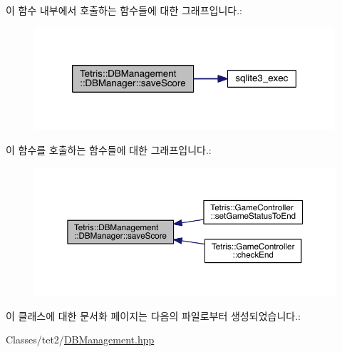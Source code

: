 이 함수 내부에서 호출하는 함수들에 대한 그래프입니다.\+:
\nopagebreak
\begin{figure}[H]
\begin{center}
\leavevmode
\includegraphics[width=316pt]{class_tetris_1_1_d_b_management_1_1_d_b_manager_aef16da1d2e564caa309bfc3b3e419d7e_cgraph}
\end{center}
\end{figure}
이 함수를 호출하는 함수들에 대한 그래프입니다.\+:
\nopagebreak
\begin{figure}[H]
\begin{center}
\leavevmode
\includegraphics[width=350pt]{class_tetris_1_1_d_b_management_1_1_d_b_manager_aef16da1d2e564caa309bfc3b3e419d7e_icgraph}
\end{center}
\end{figure}


이 클래스에 대한 문서화 페이지는 다음의 파일로부터 생성되었습니다.\+:\begin{DoxyCompactItemize}
\item 
Classes/tet2/\hyperlink{_d_b_management_8hpp}{D\+B\+Management.\+hpp}\end{DoxyCompactItemize}
